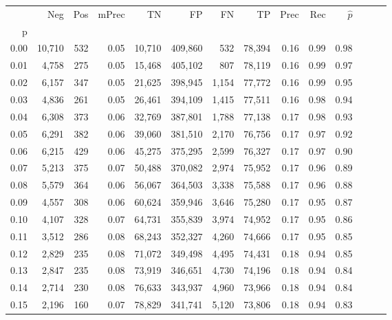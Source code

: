 \begin{tabular}{rrrrrrrrrrrrrr}
\toprule
{} &     Neg &    Pos & mPrec &       TN &       FP &      FN &      TP &  Prec &   Rec & $\hat{p}$ \\
p    &         &        &       &          &          &         &         &       &       &           \\
\midrule
0.00 &  10,710 &    532 &  0.05 &   10,710 &  409,860 &     532 &  78,394 &  0.16 &  0.99 &      0.98 \\
0.01 &   4,758 &    275 &  0.05 &   15,468 &  405,102 &     807 &  78,119 &  0.16 &  0.99 &      0.97 \\
0.02 &   6,157 &    347 &  0.05 &   21,625 &  398,945 &   1,154 &  77,772 &  0.16 &  0.99 &      0.95 \\
0.03 &   4,836 &    261 &  0.05 &   26,461 &  394,109 &   1,415 &  77,511 &  0.16 &  0.98 &      0.94 \\
0.04 &   6,308 &    373 &  0.06 &   32,769 &  387,801 &   1,788 &  77,138 &  0.17 &  0.98 &      0.93 \\
0.05 &   6,291 &    382 &  0.06 &   39,060 &  381,510 &   2,170 &  76,756 &  0.17 &  0.97 &      0.92 \\
0.06 &   6,215 &    429 &  0.06 &   45,275 &  375,295 &   2,599 &  76,327 &  0.17 &  0.97 &      0.90 \\
0.07 &   5,213 &    375 &  0.07 &   50,488 &  370,082 &   2,974 &  75,952 &  0.17 &  0.96 &      0.89 \\
0.08 &   5,579 &    364 &  0.06 &   56,067 &  364,503 &   3,338 &  75,588 &  0.17 &  0.96 &      0.88 \\
0.09 &   4,557 &    308 &  0.06 &   60,624 &  359,946 &   3,646 &  75,280 &  0.17 &  0.95 &      0.87 \\
0.10 &   4,107 &    328 &  0.07 &   64,731 &  355,839 &   3,974 &  74,952 &  0.17 &  0.95 &      0.86 \\
0.11 &   3,512 &    286 &  0.08 &   68,243 &  352,327 &   4,260 &  74,666 &  0.17 &  0.95 &      0.85 \\
0.12 &   2,829 &    235 &  0.08 &   71,072 &  349,498 &   4,495 &  74,431 &  0.18 &  0.94 &      0.85 \\
0.13 &   2,847 &    235 &  0.08 &   73,919 &  346,651 &   4,730 &  74,196 &  0.18 &  0.94 &      0.84 \\
0.14 &   2,714 &    230 &  0.08 &   76,633 &  343,937 &   4,960 &  73,966 &  0.18 &  0.94 &      0.84 \\
0.15 &   2,196 &    160 &  0.07 &   78,829 &  341,741 &   5,120 &  73,806 &  0.18 &  0.94 &      0.83 \\

\end{tabular}
